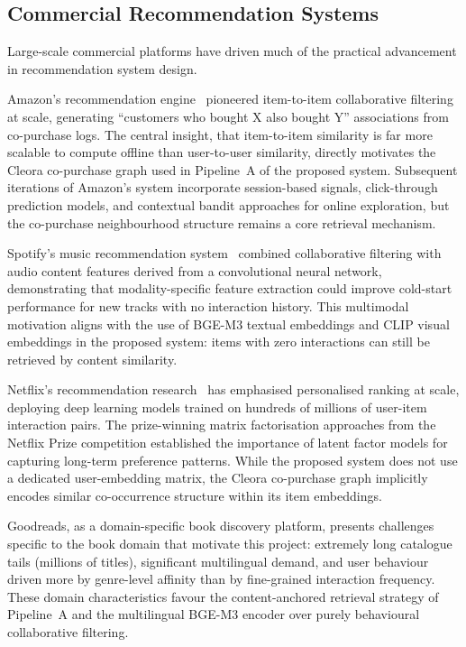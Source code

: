 \subsection{Commercial Recommendation Systems}

Large-scale commercial platforms have driven much of the practical advancement in recommendation system design.

Amazon's recommendation engine~\cite{linden2003amazon} pioneered item-to-item collaborative filtering at scale, generating ``customers who bought X also bought Y'' associations from co-purchase logs.
The central insight, that item-to-item similarity is far more scalable to compute offline than user-to-user similarity, directly motivates the Cleora co-purchase graph used in Pipeline~A of the proposed system.
Subsequent iterations of Amazon's system incorporate session-based signals, click-through prediction models, and contextual bandit approaches for online exploration, but the co-purchase neighbourhood structure remains a core retrieval mechanism.

Spotify's music recommendation system~\cite{van2013deep} combined collaborative filtering with audio content features derived from a convolutional neural network, demonstrating that modality-specific feature extraction could improve cold-start performance for new tracks with no interaction history.
This multimodal motivation aligns with the use of BGE-M3 textual embeddings and CLIP visual embeddings in the proposed system: items with zero interactions can still be retrieved by content similarity.

Netflix's recommendation research~\cite{gomez2016deep} has emphasised personalised ranking at scale, deploying deep learning models trained on hundreds of millions of user-item interaction pairs.
The prize-winning matrix factorisation approaches from the Netflix Prize competition established the importance of latent factor models for capturing long-term preference patterns.
While the proposed system does not use a dedicated user-embedding matrix, the Cleora co-purchase graph implicitly encodes similar co-occurrence structure within its item embeddings.

Goodreads, as a domain-specific book discovery platform, presents challenges specific to the book domain that motivate this project: extremely long catalogue tails (millions of titles), significant multilingual demand, and user behaviour driven more by genre-level affinity than by fine-grained interaction frequency.
These domain characteristics favour the content-anchored retrieval strategy of Pipeline~A and the multilingual BGE-M3 encoder over purely behavioural collaborative filtering.

